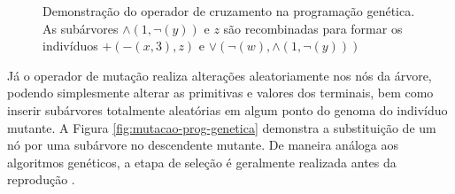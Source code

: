 \documentclass[
	12pt,				%
	openright,			%
	twoside,			%
	a4paper,			%
	tcc,			%
	]{ABNT-DC-UEL}
\begin{document}
\begin{figure}[htb]
\begin{subfigure}{0.4\textwidth}
{}
    \end{subfigure}
    \caption{Demonstração do operador de cruzamento na programação genética. As subárvores $\land(1,\lnot(y))$ e $z$ são recombinadas para formar os indivíduos $+(-(x,3),z)$ e $\lor(\lnot(w),\land(1,\lnot(y)))$}
    \label{fig:crossover-prog-genetica}
\end{figure}

Já o operador de mutação realiza alterações aleatoriamente nos nós da árvore, podendo simplesmente alterar as primitivas e valores dos terminais, bem como inserir subárvores totalmente aleatórias em algum ponto do genoma do indivíduo mutante. A Figura \ref{fig:mutacao-prog-genetica} demonstra a substituição de um nó por uma subárvore no descendente mutante. De maneira análoga aos algoritmos genéticos, a etapa de seleção é geralmente realizada antes da reprodução \cite{koza:94, back:00}.
\end{document}
